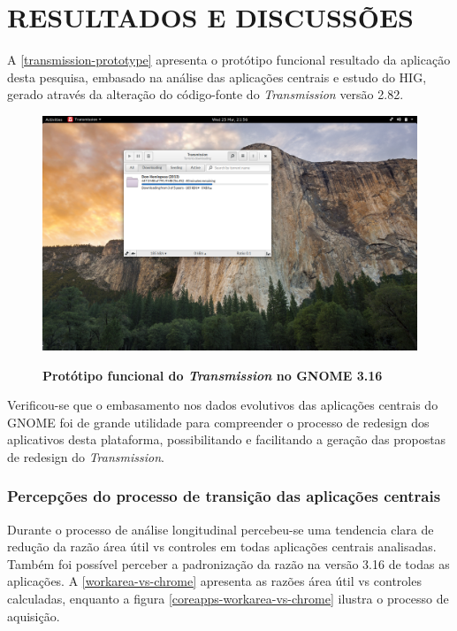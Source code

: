 \chapter{RESULTADOS E DISCUSSÕES}

A \autoref{transmission-prototype} apresenta o protótipo funcional
resultado da aplicação desta pesquisa, embasado na análise das aplicações
centrais e estudo do HIG, gerado através da alteração do código-fonte do
\textit{Transmission} versão 2.82.

\begin{figure}[!ht]
  \begin{center}
    \caption{\textbf{Protótipo funcional do \textit{Transmission} no GNOME 3.16}}
    \includegraphics[width=\textwidth]{image/transmission-gtk3-main.png}
    \label{transmission-prototype}
  \end{center}
\end{figure}

Verificou-se que o embasamento nos dados evolutivos das aplicações centrais do
GNOME foi de grande utilidade para compreender o processo de redesign dos
aplicativos desta plataforma, possibilitando e facilitando a geração das
propostas de redesign do \textit{Transmission}.

\subsection{Percepções do processo de transição das aplicações centrais}

Durante o processo de análise longitudinal percebeu-se uma tendencia clara de
redução da razão área útil vs controles em todas aplicações centrais analisadas.
Também foi possível perceber a padronização da razão na versão 3.16 de todas as
aplicações. A \autoref{workarea-vs-chrome} apresenta as razões área útil vs
controles calculadas, enquanto a figura \autoref{coreapps-workarea-vs-chrome}
ilustra o processo de aquisição.

